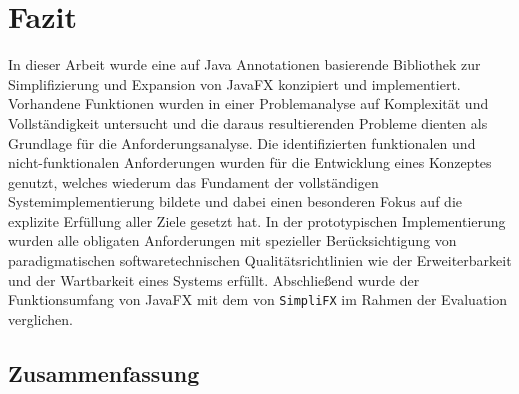 \chapter{Fazit}
\label{fazit}
In dieser Arbeit wurde eine auf Java Annotationen basierende Bibliothek zur Simplifizierung und Expansion von JavaFX konzipiert und implementiert. Vorhandene Funktionen wurden in einer Problemanalyse auf Komplexität und Vollständigkeit untersucht und die daraus resultierenden Probleme dienten als Grundlage für die Anforderungsanalyse. Die identifizierten funktionalen und nicht-funktionalen Anforderungen wurden für die Entwicklung eines Konzeptes genutzt, welches wiederum das Fundament der vollständigen Systemimplementierung bildete und dabei einen besonderen Fokus auf die explizite Erfüllung aller Ziele gesetzt hat. In der prototypischen Implementierung wurden alle obligaten Anforderungen mit spezieller Berücksichtigung von paradigmatischen softwaretechnischen Qualitätsrichtlinien wie der Erweiterbarkeit und der Wartbarkeit eines Systems erfüllt. Abschließend wurde der Funktionsumfang von JavaFX mit dem von \texttt{SimpliFX} im Rahmen der Evaluation verglichen. 

\section{Zusammenfassung}
\label{zusammenfassung}


